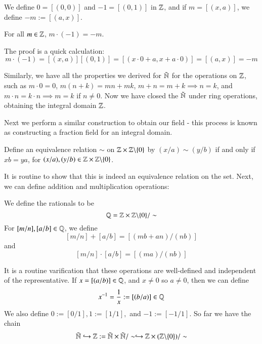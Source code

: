 \begin{definition}
    We define $0 = [(0,0)]$ and $-1 = [(0,1)]$ in $\mathbb Z$, and if $m = [(x,a)]$, we define $-m := [(a,x)]$.
\end{definition}

\begin{proposition}
    For all $m \in \mathbb Z$, $m \cdot (-1) = -m$.
\end{proposition}
The proof is a quick calculation: \begin{equation*}
    m\cdot (-1) = [(x,a)][(0,1)] = [(x\cdot 0+a,x+a\cdot 0)] = [(a,x)] = -m
\end{equation*}

Similarly, we have all the properties we derived for $\tilde{\mathbb N}$ for the operations on $\mathbb Z$, such as $m\cdot 0 = 0$, $m(n+k) = mn+mk$, $m+n=m+k \implies n =k$, and $m\cdot n= k\cdot n\implies m=k$ if $n \neq 0$. Now we have closed the $\tilde{\mathbb N}$ under ring operations, obtaining the integral domain $\mathbb Z$.

Next we perform a similar construction to obtain our field - this process is known as constructing a fraction field for an integral domain.

\begin{definition}
    Define an equivalence relation $\sim$ on $\mathbb Z\times \mathbb Z\backslash\{0\}$ by $(x/a)\sim(y/b)$ if and only if $xb = ya$, for $(x/a),(y/b) \in \mathbb Z\times \mathbb Z\backslash\{0\}$.
\end{definition}

It is routine to show that this is indeed an equivalence relation on the set. Next, we can define addition and multiplication operations:

\begin{definition}
    We define the rationals to be \begin{equation*}
        \mathbb Q = \mathbb Z\times \mathbb Z\backslash\{0\}/\sim
    \end{equation*}
    For $[m/n],[a/b] \in \mathbb Q$, we define $$[m/n] + [a/b] = [(mb+an)/(nb)]$$ and $$[m/n]\cdot[a/b] = [(ma)/(nb)]$$
\end{definition}

It is a routine varification that these operations are well-defined and independent of the representative. If $x = [(a/b)] \in \mathbb Q$, and $x \neq 0$ so $a \neq 0$, then we can define $$x^{-1} = \frac{1}{x} := [(b/a)] \in \mathbb Q$$ We also define $0 := [0/1], 1 := [1/1],$ and $-1 := [-1/1]$. So far we have the chain $$\tilde{\mathbb N}\hookrightarrow \mathbb Z := \tilde{\mathbb N}\times \tilde{\mathbb N}/\sim \hookrightarrow \mathbb Z\times (\mathbb Z\backslash\{0\})/\sim$$

